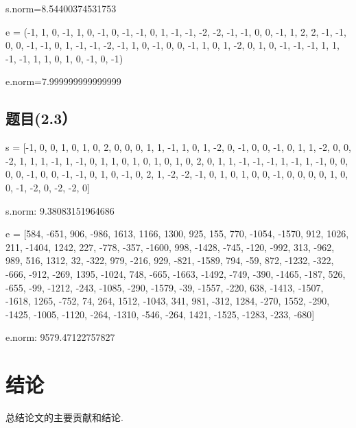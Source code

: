 \documentclass[12pt,a4paper]{article}
\numberwithin{equation}{section}
\begin{document}
s.norm=8.54400374531753

\hspace*{\fill}

e = (-1, 1, 0, -1, 1, 0, -1, 0, -1, -1, 0, 1, -1, -1, -2, -2, -1, -1, 0, 0, -1, 1, 2, 2, -1,
-1, 0, 0, -1, -1, 0, 1, -1, -1, -2, -1, 1, 0, -1, 0, 0, -1, 1, 0, 1, -2, 0, 1, 0, -1, -1,
-1, 1, 1, -1, -1, 1, 1, 0, 1, 0, -1, 0, -1)

e.norm=7.999999999999999

\subsection{题目(2.3）}

s = [-1, 0, 0, 1, 0, 1, 0, 2, 0, 0, 0, 1, 1, -1, 1, 0, 1, -2, 0, -1, 0, 0, -1, 0, 1, 1, -2, 0, 0, -2, 1, 1, 1, -1, 1, -1, 0, 1, 1, 0, 1, 0, 1, 0, 1, 0, 2, 0, 1, 1, -1, -1, -1, 1, -1, 1, -1, 0, 0, 0, 0, -1, 0, 0, -1, -1, 0, 1, 0, -1, 0, 2, 1, -2, -2, -1, 0, 1, 0, 1, 0, 0, -1, 0, 0, 0, 0, 1, 0, 0, -1, -2, 0, -2, -2, 0]

s.norm: 9.38083151964686

\hspace*{\fill}

e = [584, -651, 906, -986, 1613, 1166, 1300, 925, 155, 770, -1054, -1570, 912, 1026, 211, -1404, 1242, 227, -778, -357, -1600, 998, -1428, -745, -120, -992, 313, -962, 989, 516, 1312, 32, -322, 979, -216, 929, -821, -1589, 794, -59, 872, -1232, -322, -666, -912, -269, 1395, -1024, 748, -665, -1663, -1492, -749, -390, -1465, -187, 526, -655, -99, -1212, -243, -1085, -290, -1579, -39, -1557, -220, 638, -1413, -1507, -1618, 1265, -752, 74, 264, 1512, -1043, 341, 981, -312, 1284, -270, 1552, -290, -1425, -1005, -1120, -264, -1310, -546, -264, 1421, -1525, -1283, -233, -680]

e.norm: 9579.47122757827

\section{结论}

总结论文的主要贡献和结论.

\vspace{1em}

{\songti\fontsize{12pt}{18pt}\selectfont
	
}
%
\end{document}

